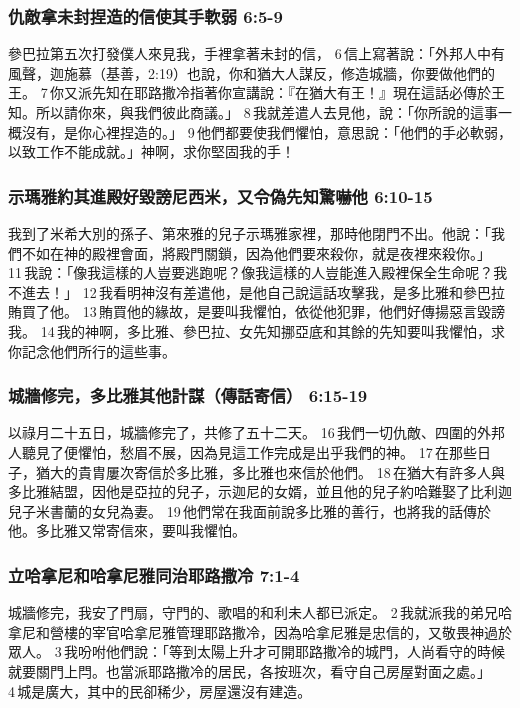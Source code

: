 \subsubsection{仇敵拿未封捏造的信使其手軟弱 6:5-9}
參巴拉第五次打發僕人來見我，手裡拿著未封的信， 6 信上寫著說：「外邦人中有風聲，迦施慕（基善，2:19）也說，你和猶大人謀反，修造城牆，你要做他們的王。 7 你又派先知在耶路撒冷指著你宣講說：『在猶大有王！』現在這話必傳於王知。所以請你來，與我們彼此商議。」 8 我就差遣人去見他，說：「你所說的這事一概沒有，是你心裡捏造的。」 9 他們都要使我們懼怕，意思說：「他們的手必軟弱，以致工作不能成就。」神啊，求你堅固我的手！

\subsubsection{示瑪雅約其進殿好毀謗尼西米，又令偽先知驚嚇他 6:10-15}
我到了米希大別的孫子、第來雅的兒子示瑪雅家裡，那時他閉門不出。他說：「我們不如在神的殿裡會面，將殿門關鎖，因為他們要來殺你，就是夜裡來殺你。」 11 我說：「像我這樣的人豈要逃跑呢？像我這樣的人豈能進入殿裡保全生命呢？我不進去！」 12 我看明神沒有差遣他，是他自己說這話攻擊我，是多比雅和參巴拉賄買了他。 13 賄買他的緣故，是要叫我懼怕，依從他犯罪，他們好傳揚惡言毀謗我。 14 我的神啊，多比雅、參巴拉、女先知挪亞底和其餘的先知要叫我懼怕，求你記念他們所行的這些事。

\subsubsection{城牆修完，多比雅其他計謀（傳話寄信） 6:15-19}
以祿月二十五日，城牆修完了，共修了五十二天。 16 我們一切仇敵、四圍的外邦人聽見了便懼怕，愁眉不展，因為見這工作完成是出乎我們的神。 17 在那些日子，猶大的貴胄屢次寄信於多比雅，多比雅也來信於他們。 18 在猶大有許多人與多比雅結盟，因他是亞拉的兒子，示迦尼的女婿，並且他的兒子約哈難娶了比利迦兒子米書蘭的女兒為妻。 19 他們常在我面前說多比雅的善行，也將我的話傳於他。多比雅又常寄信來，要叫我懼怕。



\subsubsection{立哈拿尼和哈拿尼雅同治耶路撒冷 7:1-4}
城牆修完，我安了門扇，守門的、歌唱的和利未人都已派定。 2 我就派我的弟兄哈拿尼和營樓的宰官哈拿尼雅管理耶路撒冷，因為哈拿尼雅是忠信的，又敬畏神過於眾人。 3 我吩咐他們說：「等到太陽上升才可開耶路撒冷的城門，人尚看守的時候就要關門上閂。也當派耶路撒冷的居民，各按班次，看守自己房屋對面之處。」 4 城是廣大，其中的民卻稀少，房屋還沒有建造。

